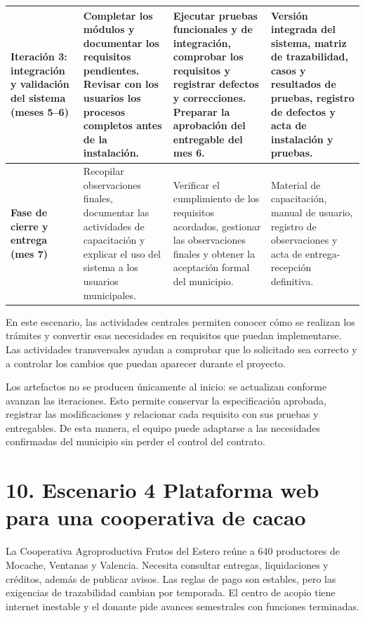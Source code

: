 \documentclass[10pt,letterpaper]{article}
\newcommand{\separa}{\hspace{0.25em}\raisebox{0.25ex}{\rule{0.38ex}{0.38ex}}\hspace{0.25em}}
\newcommand{\titulo}[1]{\section*{\textcolor{verde}{#1}}}
\begin{document}
\begin{longtable}{@{}p{3.15cm}p{7.15cm}p{7.15cm}p{7.15cm}@{}}
\textbf{Iteración 3: integración y validación del sistema (meses 5--6)}&Completar los módulos y documentar los requisitos pendientes. Revisar con los usuarios los procesos completos antes de la instalación.&Ejecutar pruebas funcionales y de integración, comprobar los requisitos y registrar defectos y correcciones. Preparar la aprobación del entregable del mes 6.&Versión integrada del sistema, matriz de trazabilidad, casos y resultados de pruebas, registro de defectos y acta de instalación y pruebas.\\\hline
\textbf{Fase de cierre y entrega (mes 7)}&Recopilar observaciones finales, documentar las actividades de capacitación y explicar el uso del sistema a los usuarios municipales.&Verificar el cumplimiento de los requisitos acordados, gestionar las observaciones finales y obtener la aceptación formal del municipio.&Material de capacitación, manual de usuario, registro de observaciones y acta de entrega-recepción definitiva.\\
\end{longtable}
\par
\normalsize
\par
En este escenario, las actividades centrales permiten conocer cómo se realizan los trámites y convertir esas necesidades en requisitos que puedan implementarse. Las actividades transversales ayudan a comprobar que lo solicitado sea correcto y a controlar los cambios que puedan aparecer durante el proyecto.
\par
Los artefactos no se producen únicamente al inicio: se actualizan conforme avanzan las iteraciones. Esto permite conservar la especificación aprobada, registrar las modificaciones y relacionar cada requisito con sus pruebas y entregables. De esta manera, el equipo puede adaptarse a las necesidades confirmadas del municipio sin perder el control del contrato.
\par
\titulo{10. Escenario 4 \separa Plataforma web para una cooperativa de cacao}
\par
La Cooperativa Agroproductiva Frutos del Estero reúne a 640 productores de Mocache, Ventanas y Valencia. Necesita consultar entregas, liquidaciones y créditos, además de publicar avisos. Las reglas de pago son estables, pero las exigencias de trazabilidad cambian por temporada. El centro de acopio tiene internet inestable y el donante pide avances semestrales con funciones terminadas.
\par
\scriptsize
\par
\end{document}
